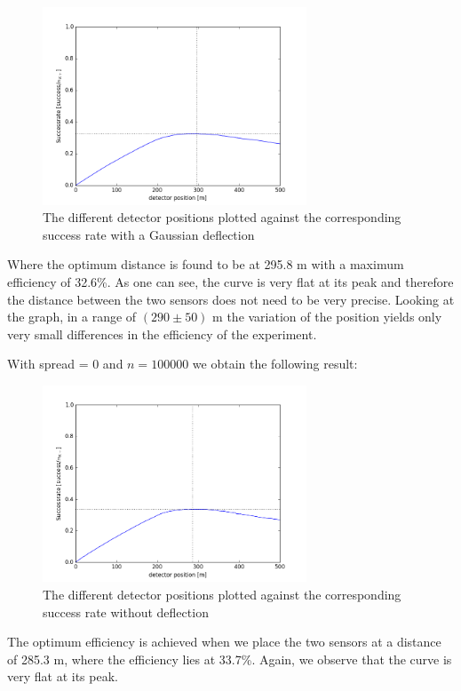 \documentclass[a4paper,parskip,11pt, DIV12]{scrreprt}
\begin{document}
	\begin{figure}[h] 
		\centering
		\includegraphics[width=0.7\textwidth]{Simulation100kWithSpread.png} 
		\caption{The different detector positions plotted against the corresponding success rate with a Gaussian deflection}   
	\end{figure}
	
	Where the optimum distance is found to be at 295.8 m with a maximum efficiency of 32.6\%. As one can see, the curve is very flat at its peak and therefore the distance between the two sensors does not need to be very precise. Looking at the graph, in a range of $(290 \pm 50)$ m the variation of the position yields only very small differences in the efficiency of the experiment.
	
	With spread = 0 and $n = 100000$ we obtain the following result:
	
	\begin{figure}[h] 
		\centering
		\includegraphics[width=0.7\textwidth]{Simulation100kNoSpread.png} 
		\caption{The different detector positions plotted against the corresponding success rate without deflection}   
	\end{figure}
	
	The optimum efficiency is achieved when we place the two sensors at a distance of 285.3 m, where the efficiency lies at 33.7\%. Again, we observe that the curve is very flat at its peak. 
	
\end{document}
